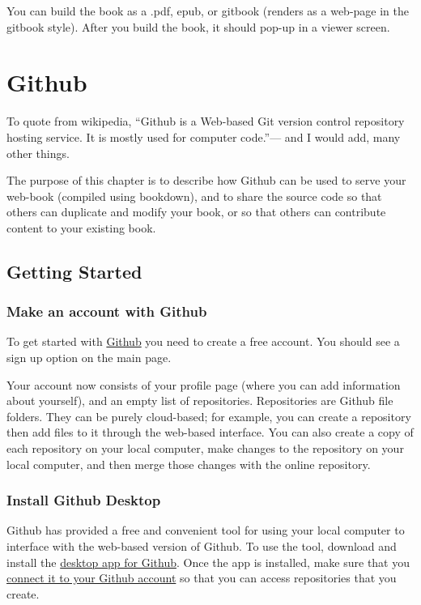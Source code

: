 \documentclass[]{book}
\begin{document}
You can build the book as a .pdf, epub, or gitbook (renders as a
web-page in the gitbook style). After you build the book, it should
pop-up in a viewer screen.

\chapter{Github}\label{github}

To quote from wikipedia, ``Github is a Web-based Git version control
repository hosting service. It is mostly used for computer code.''---
and I would add, many other things.

The purpose of this chapter is to describe how Github can be used to
serve your web-book (compiled using bookdown), and to share the source
code so that others can duplicate and modify your book, or so that
others can contribute content to your existing book.

\section{Getting Started}\label{getting-started}

\subsection{Make an account with
Github}\label{make-an-account-with-github}

To get started with \href{https://github.com}{Github} you need to create
a free account. You should see a sign up option on the main page.

Your account now consists of your profile page (where you can add
information about yourself), and an empty list of repositories.
Repositories are Github file folders. They can be purely cloud-based;
for example, you can create a repository then add files to it through
the web-based interface. You can also create a copy of each repository
on your local computer, make changes to the repository on your local
computer, and then merge those changes with the online repository.

\subsection{Install Github Desktop}\label{install-github-desktop}

Github has provided a free and convenient tool for using your local
computer to interface with the web-based version of Github. To use the
tool, download and install the \href{https://desktop.github.com}{desktop
app for Github}. Once the app is installed, make sure that you
\href{https://help.github.com/desktop/guides/getting-started-with-github-desktop/authenticating-to-github/}{connect
it to your Github account} so that you can access repositories that you
create.
\end{document}
